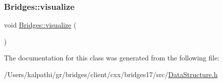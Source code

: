 \subsubsection{\texorpdfstring{Bridges\+::visualize}{Bridges::visualize}}
{\footnotesize\ttfamily void \mbox{\hyperlink{namespacebridges_1_1_bridges_a2806e395134614cdd6327400b53d28ad}{Bridges\+::visualize}} (\begin{DoxyParamCaption}{ }\end{DoxyParamCaption})\hspace{0.3cm}{\ttfamily [friend]}}



The documentation for this class was generated from the following file\+:\begin{DoxyCompactItemize}
\item 
/\+Users/kalpathi/gr/bridges/client/cxx/bridges17/src/\mbox{\hyperlink{_data_structure_8h}{Data\+Structure.\+h}}\end{DoxyCompactItemize}
